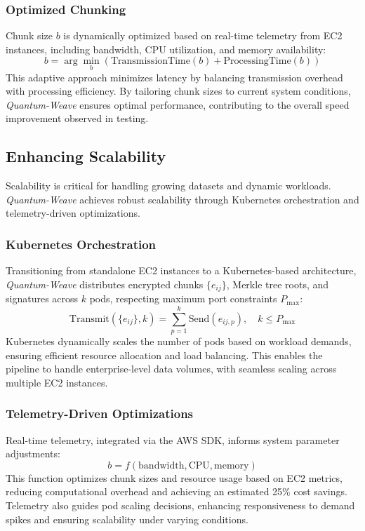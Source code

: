 \documentclass[12pt]{article}
\begin{document}
\subsubsection{Optimized Chunking}
Chunk size \( b \) is dynamically optimized based on real-time telemetry from EC2 instances, including bandwidth, CPU utilization, and memory availability:
\[
b = \arg\min_b \left( \text{TransmissionTime}(b) + \text{ProcessingTime}(b) \right)
\]
This adaptive approach minimizes latency by balancing transmission overhead with processing efficiency. By tailoring chunk sizes to current system conditions, \textit{Quantum-Weave} ensures optimal performance, contributing to the overall speed improvement observed in testing.

\subsection{Enhancing Scalability}
Scalability is critical for handling growing datasets and dynamic workloads. \textit{Quantum-Weave} achieves robust scalability through Kubernetes orchestration and telemetry-driven optimizations.

\subsubsection{Kubernetes Orchestration}
Transitioning from standalone EC2 instances to a Kubernetes-based architecture, \textit{Quantum-Weave} distributes encrypted chunks \( \{e_{ij}\} \), Merkle tree roots, and signatures across \( k \) pods, respecting maximum port constraints \( P_{\max} \):
\[
\text{Transmit}(\{e_{ij}\}, k) = \sum_{p=1}^k \text{Send}(e_{ij,p}), \quad k \leq P_{\max}
\]
Kubernetes dynamically scales the number of pods based on workload demands, ensuring efficient resource allocation and load balancing. This enables the pipeline to handle enterprise-level data volumes, with seamless scaling across multiple EC2 instances.

\subsubsection{Telemetry-Driven Optimizations}
Real-time telemetry, integrated via the AWS SDK, informs system parameter adjustments:
\[
b = f(\text{bandwidth}, \text{CPU}, \text{memory})
\]
This function optimizes chunk sizes and resource usage based on EC2 metrics, reducing computational overhead and achieving an estimated 25\% cost savings. Telemetry also guides pod scaling decisions, enhancing responsiveness to demand spikes and ensuring scalability under varying conditions.
\end{document}
